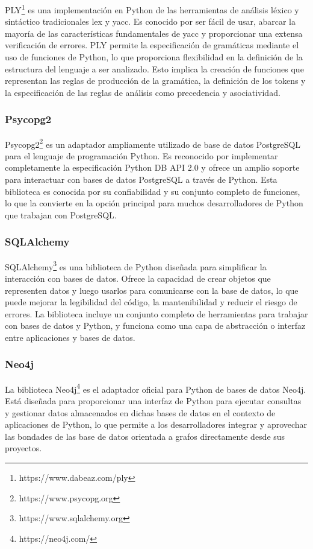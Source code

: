PLY\footnote{https://www.dabeaz.com/ply} es una implementación en Python de las 
herramientas de análisis léxico y sintáctico 
tradicionales lex y yacc. Es conocido por ser fácil de usar,
abarcar la mayoría de las características fundamentales de yacc y proporcionar una extensa verificación de errores. 
PLY permite la especificación de gramáticas 
mediante el uso de funciones de Python, lo que proporciona flexibilidad en la definición de la estructura del 
lenguaje a ser analizado. Esto implica la creación de funciones que representan las reglas de producción de la 
gramática, la definición de los tokens y la especificación de las reglas de 
análisis como precedencia y asociatividad.

\subsubsection{Psycopg2}

Psycopg2\footnote{https://www.psycopg.org} es un adaptador ampliamente utilizado de base de datos PostgreSQL 
para el lenguaje de programación 
Python. Es reconocido por implementar completamente la especificación Python DB API 2.0 y ofrece un amplio 
soporte para interactuar con bases de datos PostgreSQL a través de Python. Esta biblioteca es conocida por 
su confiabilidad y su conjunto completo de funciones, lo que la convierte en la opción principal para muchos 
desarrolladores de Python que trabajan con PostgreSQL.

\subsubsection{SQLAlchemy}

SQLAlchemy\footnote{https://www.sqlalchemy.org} es una biblioteca de Python diseñada para simplificar la 
interacción con bases de datos. Ofrece la 
capacidad de crear objetos que representen datos y luego usarlos para comunicarse con la base de datos, lo que 
puede mejorar la legibilidad del código, la mantenibilidad y reducir el riesgo de errores. La biblioteca incluye 
un conjunto completo de herramientas para trabajar con bases de datos y Python, y funciona como una capa de 
abstracción o interfaz entre aplicaciones y bases de datos. 

\subsubsection{Neo4j}

La biblioteca Neo4j\footnote{https://neo4j.com/} es el adaptador oficial para Python de bases de datos Neo4j. Está 
diseñada para proporcionar una 
interfaz de Python para ejecutar 
consultas y gestionar datos almacenados en dichas bases de datos en el contexto de aplicaciones de Python, lo que permite 
a los desarrolladores integrar y aprovechar las bondades de las base de datos orientada a grafos directamente desde sus 
proyectos.

